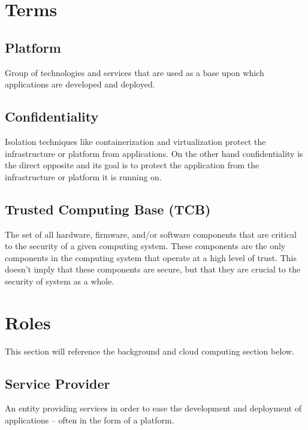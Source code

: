 \section{Terms}

\subsection{Platform}

Group of technologies and services that are used as a base upon which
applications are developed and deployed.


\subsection{Confidentiality}
\label{sec:confidentiality}

Isolation techniques like containerization and virtualization protect the
infrastructure or platform from applications. On the other hand confidentiality
is the direct opposite and its goal is to protect the application from the
infrastructure or platform it is running on.

\subsection{Trusted Computing Base (TCB)}

The set of all hardware, firmware, and/or software components that are critical
to the security of a given computing system. These components are the only
components in the computing system that operate at a high level of trust. This
doesn't imply that these components are secure, but that they are crucial to the
security of system as a whole.

\section{Roles}

This section will reference the background and cloud computing section below.

\subsection{Service Provider}

An entity providing services in order to ease the development and deployment of
applications -- often in the form of a platform.

